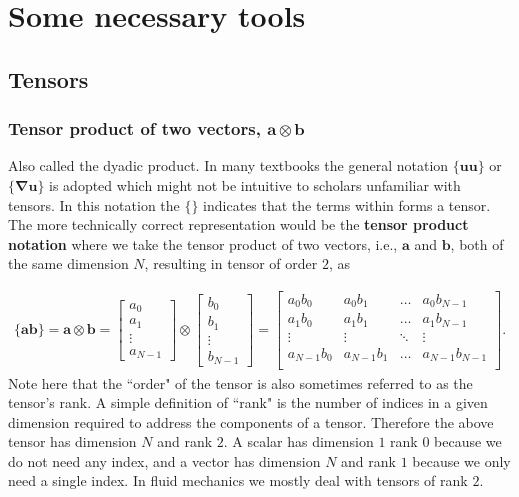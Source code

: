 \documentclass[11pt,letterpaper,titlepage]{article}
\newcommand{\beqn}{\begin{equation}
	\begin{aligned}}
\newcommand{\eeqn}{\end{aligned}
	\end{equation}}
\newcommand{\bnabla}{\boldsymbol{\nabla}}
\newcommand{\bvel}{\mathbf{u}}
\numberwithin{equation}{section}
\begin{document}
\newpage 
\section{Some necessary tools}

\subsection{Tensors}
\subsubsection{Tensor product of two vectors, $\mathbf{a}\otimes \mathbf{b}$}
Also called the dyadic product. In many textbooks the general notation $\{\bvel \bvel\}$ or $\{ \bnabla \bvel \}$ is adopted which might not be intuitive to scholars unfamiliar with tensors. In this notation the $\{\}$ indicates that the terms within forms a tensor. The more technically correct representation would be the \textbf{tensor product notation} where we take the tensor product of two vectors, i.e., $\mathbf{a}$ and $\mathbf{b}$, both of the same dimension $N$, resulting in tensor of order $2$, as

\beqn 
\{\mathbf{a} \mathbf{b} \} = 
\mathbf{a} \otimes \mathbf{b} 
=
\begin{bmatrix}
a_0 \\ a_1 \\ \vdots \\ a_{N-1}
\end{bmatrix}
\otimes 
\begin{bmatrix}
b_0 \\ b_1 \\ \vdots \\ b_{N-1}
\end{bmatrix}
=
\begin{bmatrix}
a_0 b_0 & a_0 b_1 & \hdots & a_0 b_{N-1} \\
a_1 b_0 & a_1 b_1 & \hdots & a_1 b_{N-1} \\
\vdots   & \vdots   & \ddots & \vdots \\
a_{N-1} b_0 & a_{N-1} b_1 & \hdots & a_{N-1} b_{N-1} \\
\end{bmatrix}.
\eeqn 
\newline 
Note here that the ``order" of the tensor is also sometimes referred to as the tensor's rank. A simple definition of ``rank" is the number of indices in a given dimension required to address the components of a tensor. Therefore the above tensor has dimension $N$ and rank $2$. A scalar has dimension $1$ rank $0$ because we do not need any index, and a vector has dimension $N$ and rank $1$ because we only need a single index. In fluid mechanics we mostly deal with tensors of rank $2$.
\end{document}
